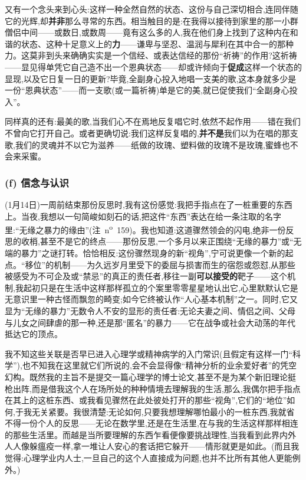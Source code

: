 又有一个念头来到心头:这样一种全然自然的状态、这份与自己深切相合,连同伴随它的光辉,却\textbf{并非}那么寻常的东西。相当触目的是:在我得以接待到家里的那一小群僧侣中间——或数日,或数周——竟有这么多的人,我在他们身上找到了这种内在和谐的状态、这种十足意义上的\textbf{力}——谦卑与坚忍、温润与犀利在其中合一的那种力。这莫非到头来确确实实是一个信经、或表达信经的那份“祈祷”的作用?这祈祷——\dmark{}显见得单凭它自己造不出一个恩典状态——却或许倾向于\textbf{促成}这样一个状态的显现,以及它日复一日的更新?毕竟,全副身心投入地唱一支美的歌,这本身就多少是一份“恩典状态”——而一支歌(或一篇祈祷)单是它的美,就已促使我们“全副身心投入”。

同样真的还有:最美的歌,当我们心不在焉地反复唱它时,依然不起作用——错在我们不曾向它打开自己。或者更确切说:我们这样反复唱的,\textbf{并不是}我们以为在唱的那支歌,我们的灵魂并不以它为滋养——纸做的玫瑰、塑料做的玫瑰不是玫瑰,蜜蜂也不会来采蜜。

\subsubsection*{(f) 信念与认识}
\label{ch18:local:h76}

\label{ch18:local:n71}

(1月14日)一周前结束那份反思时,我有这份感觉:我把手指点在了一桩重要的东西上。当夜,我想以一句简峻如刻石的话,把这件“东西”表达在给一条注取的名字里:“无缘之暴力的缘由”(注~n\textsuperscript{o}~159)。我也知道:这道骤然领会的闪电,绝非一份反思的收梢,甚至不是它的终点——那份反思,一个多月以来正围绕“无缘的暴力”或“无端的暴力”之谜打转。恰恰相反:这份骤然现身的新“视角”,宁可说更像一个新的起点。“移位”的机制——为久远岁月里受下的委屈与损害而生的宿怨或怨怼,从那些被感受为不可企及或“禁忌”的真正的责任者,移往一副\textbf{可以接受的}靶子——这个机制,我起初只是在生活中这样那样孤立的个案里零零星星地认出它,心里默默认它是无意识里一种古怪而飘忽的畸变;如今它终被认作“人心基本机制”之一。同时,它又显为“无缘的暴力”无数令人不安的显形的责任者:无论夫妻之间、情侣之间、父母与儿女之间肆虐的那一种,还是那“匿名”的暴力——它在战争或社会大动荡的年代抵达它的顶点。

我不知这些关联是否早已进入心理学或精神病学的入门常识\dmark{}(且假定有这样一门“科学”),也不知我在这里就它们所说的,会不会显得像“精神分析的业余爱好者”的凭空幻构。既然我的主旨不是提交一篇心理学的博士论文,甚至不是为某个新旧理论挺枪出阵,而是借我这个人在场所处的种种情境去理解我的生活,那么,我偶尔把手指点在其上的这桩东西、或我看见骤然在此处彼处打开的那些“视角”,它们的“地位”如何,于我无关紧要。我很清楚:无论如何,只要我想理解哪怕最小的一桩东西,我就省不得一份个人的反思——无论在数学里,还是在生活里,在与我的生活这样那样相连的那些生活里。而越是当所要理解的东西乍看便像要挑战理性,当我看到此界内外人人像躲瘟疫一样,拿一堆让人安心的套话把它躲开——情形就更是如此。(而且我觉得:心理学业内人士,一旦自己的这个人直接成为问题,也并不比所有其他人更能例外。)

